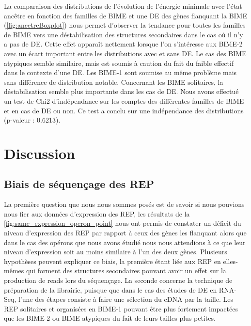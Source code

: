 \documentclass[12pt,a4paper]{report}
\begin{document}
\begin{onehalfspace}
La comparaison des distributions de l'évolution de l'énergie minimale avec l'état ancêtre en fonction des familles de BIME et une DE des gènes flanquant la BIME (\autoref{fig:ancetreBoxplot}) nous permet d'observer la tendance pour toutes les familles de BIME vers une déstabilisation des structures secondaires dans le cas où il n'y a pas de DE. Cette effet apparaît nettement lorsque l'on s'intéresse aux BIME-2 avec un écart important entre les distributions avec et sans DE. Le cas des BIME atypiques semble similaire, mais est soumis à caution du fait du faible effectif dans le contexte d'une DE. Les BIME-1 sont soumise au même problème mais sans différence de distribution notable. Concernant les BIME solitaires, la déstabilisation semble plus importante dans les cas de DE.
Nous avons effectué un test de Chi2 d'indépendance sur les comptes des différentes familles de BIME et en cas de DE ou non. Ce test a conclu sur une indépendance des distributions (p-valeur : 0.6213).


\chapter*{Discussion}

\section*{Biais de séquençage des REP}
La première question que nous nous sommes posés est de savoir si nous pouvions nous fier aux données d'expression des REP, les résultats de la \autoref{fig:same_expression_operon_point} nous ont permis de constater un déficit du niveau d'expression des REP par rapport à ceux des gènes les flanquant alors que dans le cas des opérons que nous avons étudié nous nous attendions à ce que leur niveau d'expression soit au moins similaire à l'un des deux gènes. Plusieurs hypothèses peuvent expliquer ce biais, la première étant liée aux REP en elles-mêmes qui forment des structures secondaires pouvant avoir un effet sur la production de reads lors du séquençage. La seconde concerne la technique de préparation de la librairie, puisque que dans le cas des études de DE en RNA-Seq, l'une des étapes consiste à faire une sélection du cDNA par la taille. Les REP solitaires et organisées en BIME-1 pouvant être plus fortement impactées que les BIME-2 ou BIME atypiques du fait de leurs tailles plus petites.


\end{onehalfspace}
\end{document}
